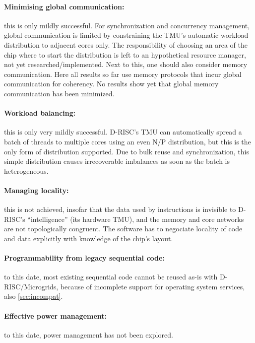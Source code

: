 \paragraph{Minimising global communication:} this is only mildly successful. For synchronization and concurrency management, global communication is limited by constraining the TMU's automatic workload distribution to adjacent cores only. The responsibility of choosing an area of the chip where to start the distribution is left to an hypothetical resource manager, not yet researched/implemented. Next to this, one should also consider memory communication. Here all results so far use memory protocols that incur global communication for coherency. No results show yet that global memory communication has been minimized.

\paragraph{Workload balancing:} this is only very mildly successful. D-RISC's TMU can automatically spread a batch of threads to multiple cores using an even N/P distribution, but this is the only form of distribution supported. Due to bulk reuse and synchronization, this simple distribution causes irrecoverable imbalances as soon as the batch is heterogeneous. 

\paragraph{Managing locality:} this is not achieved, insofar that the data used by instructions is invisible to D-RISC's ``intelligence'' (its hardware TMU), and the memory and core networks are not topologically congruent. The software has to negociate locality of code and data explicitly with knowledge of the chip's layout.

\paragraph{Programmability from legacy sequential code:} to this date, most existing sequential code cannot
be reused as-is with D-RISC/Microgrids, because of incomplete support
for operating system services, \cf also \cref{sec:incompat}.

\paragraph{Effective power management:} to this date, power management has not been explored.
 
